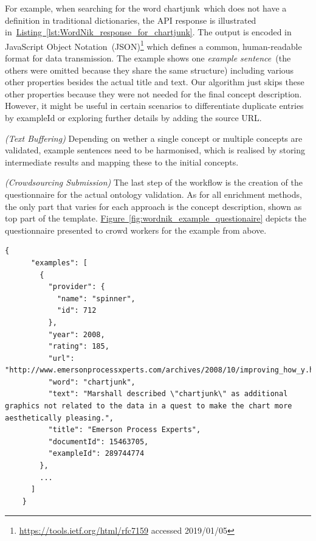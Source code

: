 \begin{enumerate}[label=\textbf{[Step \Roman*]},leftmargin=\widthof{[Step III]}+\labelsep]
		  For example, when searching for the word \guillemotright chartjunk\guillemotleft~which does not
		  have a definition in traditional dictionaries, the API response is illustrated
		  in~\hyperref[lst:WordNik_response_for_chartjunk]{Listing~\ref*{lst:WordNik_response_for_chartjunk}}. The
		  output is encoded in JavaScript Object Notation~(JSON)\footnote{\url{https://tools.ietf.org/html/rfc7159} accessed 2019/01/05}
		  which defines a common, human-readable format for data transmission. The example shows one \emph{example
		  sentence}~(the others were omitted because they share the same structure) including various other
		  properties besides the actual title and text. Our algorithm just skips these other properties because they were
		  not needed for the final concept description. However, it might be useful in certain scenarios to differentiate 
		  duplicate entries by exampleId or exploring further details by adding the source URL.
	\item \emph{(Text Buffering)} Depending on wether a single concept or multiple concepts are validated, example sentences
	      need to be harmonised, which is realised by storing intermediate results and mapping these to the initial concepts.
	\item \emph{(Crowdsourcing Submission)} The last step of the workflow is the creation of the questionnaire for the actual
	      ontology validation. As for all enrichment methods, the only part that varies for each approach is the concept
		  description, shown as top part of the template.
		  \hyperref[fig:wordnik_example_questionaire]{Figure~\ref*{fig:wordnik_example_questionaire}} depicts the
		  questionnaire presented to crowd workers for the example from above.
\end{enumerate}

\begin{lstlisting}[frame=single,breaklines=true,postbreak=\mbox{\textcolor{black}{$\hookrightarrow$}\space},caption=WordNik API response for the word \guillemotright chartjunk\guillemotleft,label=lst:WordNik_response_for_chartjunk]
	{
	  "examples": [
	    {
	      "provider": {
	        "name": "spinner",
	        "id": 712
	      },
	      "year": 2008,
	      "rating": 185,
	      "url": "http://www.emersonprocessxperts.com/archives/2008/10/improving_how_y.html",
	      "word": "chartjunk",
	      "text": "Marshall described \"chartjunk\" as additional graphics not related to the data in a quest to make the chart more aesthetically pleasing.",
	      "title": "Emerson Process Experts",
	      "documentId": 15463705,
	      "exampleId": 289744774
	    },
		...
	  ]
	}
\end{lstlisting}

